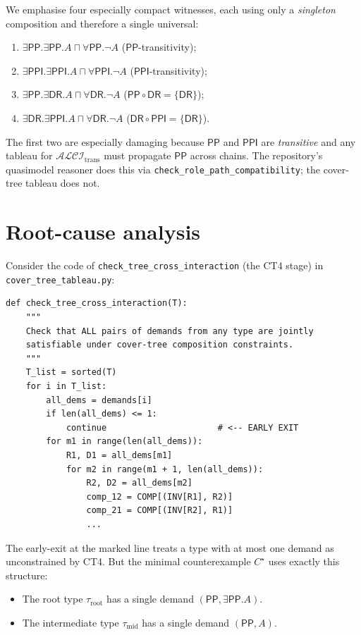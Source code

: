 \documentclass[]{ceurart}
\newcommand{\ALCI}{\mathcal{ALCI}}
\newcommand{\DR}{\mathsf{DR}}
\newcommand{\PP}{\mathsf{PP}}
\newcommand{\PPI}{\mathsf{PPI}}
\newcommand{\comp}{\circ}
\theoremstyle{definition}
\theoremstyle{remark}
\begin{document}
We emphasise four especially compact witnesses, each using only a
\emph{singleton} composition and therefore a single universal:
\begin{enumerate}
  \item $\exists \PP . \exists \PP . A \sqcap \forall \PP . \neg A$
    \hfill ($\PP$-transitivity);
  \item $\exists \PPI . \exists \PPI . A \sqcap \forall \PPI . \neg A$
    \hfill ($\PPI$-transitivity);
  \item $\exists \PP . \exists \DR . A \sqcap \forall \DR . \neg A$
    \hfill ($\PP \comp \DR = \{\DR\}$);
  \item $\exists \DR . \exists \PPI . A \sqcap \forall \DR . \neg A$
    \hfill ($\DR \comp \PPI = \{\DR\}$).
\end{enumerate}

The first two are especially damaging because $\PP$ and $\PPI$ are
\emph{transitive} and any tableau for $\ALCI_{\mathrm{trans}}$ must
propagate $\PP$ across chains.  The repository's quasimodel reasoner
does this via \verb|check_role_path_compatibility|; the cover-tree
tableau does not.

\section{Root-cause analysis}
\label{sec:rootcause}

Consider the code of \verb|check_tree_cross_interaction| (the CT4
stage) in \verb|cover_tree_tableau.py|:

\begin{lstlisting}[caption={Excerpt from \texttt{src/cover\_tree\_tableau.py}, lines 279--329, verbatim.}, label={lst:ct4}, float=t, basicstyle=\ttfamily\footnotesize]
def check_tree_cross_interaction(T):
    """
    Check that ALL pairs of demands from any type are jointly
    satisfiable under cover-tree composition constraints.
    """
    T_list = sorted(T)
    for i in T_list:
        all_dems = demands[i]
        if len(all_dems) <= 1:
            continue                      # <-- EARLY EXIT
        for m1 in range(len(all_dems)):
            R1, D1 = all_dems[m1]
            for m2 in range(m1 + 1, len(all_dems)):
                R2, D2 = all_dems[m2]
                comp_12 = COMP[(INV[R1], R2)]
                comp_21 = COMP[(INV[R2], R1)]
                ...
\end{lstlisting}

The early-exit at the marked line treats a type with at most one
demand as unconstrained by CT4. But the minimal counterexample
$C^{\star}$ uses exactly this structure:
\begin{itemize}
  \item The root type $\tau_{\mathrm{root}}$ has a single demand
    $(\PP, \exists \PP . A)$.
  \item The intermediate type $\tau_{\mathrm{mid}}$ has a single
    demand $(\PP, A)$.
\end{itemize}
\end{document}
